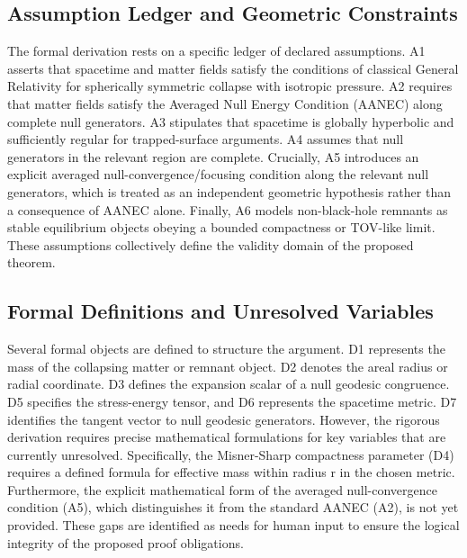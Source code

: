 \documentclass[conference]{IEEEtran}
\begin{document}
\subsection{Assumption Ledger and Geometric Constraints}
The formal derivation rests on a specific ledger of declared assumptions. A1 asserts that spacetime and matter fields satisfy the conditions of classical General Relativity for spherically symmetric collapse with isotropic pressure. A2 requires that matter fields satisfy the Averaged Null Energy Condition (AANEC) along complete null generators. A3 stipulates that spacetime is globally hyperbolic and sufficiently regular for trapped-surface arguments. A4 assumes that null generators in the relevant region are complete. Crucially, A5 introduces an explicit averaged null-convergence/focusing condition along the relevant null generators, which is treated as an independent geometric hypothesis rather than a consequence of AANEC alone. Finally, A6 models non-black-hole remnants as stable equilibrium objects obeying a bounded compactness or TOV-like limit. These assumptions collectively define the validity domain of the proposed theorem.

\subsection{Formal Definitions and Unresolved Variables}
Several formal objects are defined to structure the argument. D1 represents the mass of the collapsing matter or remnant object. D2 denotes the areal radius or radial coordinate. D3 defines the expansion scalar of a null geodesic congruence. D5 specifies the stress-energy tensor, and D6 represents the spacetime metric. D7 identifies the tangent vector to null geodesic generators. However, the rigorous derivation requires precise mathematical formulations for key variables that are currently unresolved. Specifically, the Misner-Sharp compactness parameter (D4) requires a defined formula for effective mass within radius r in the chosen metric. Furthermore, the explicit mathematical form of the averaged null-convergence condition (A5), which distinguishes it from the standard AANEC (A2), is not yet provided. These gaps are identified as needs for human input to ensure the logical integrity of the proposed proof obligations.
\end{document}
